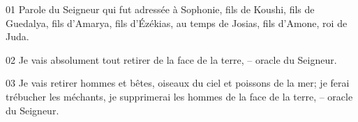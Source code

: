 01 Parole du Seigneur qui fut adressée à Sophonie, fils de Koushi, fils de Guedalya, fils d’Amarya, fils d’Ézékias, au temps de Josias, fils d’Amone, roi de Juda.

02 Je vais absolument tout retirer de la face de la terre, – oracle du Seigneur.

03 Je vais retirer hommes et bêtes, oiseaux du ciel et poissons de la mer; je ferai trébucher les méchants, je supprimerai les hommes de la face de la terre, – oracle du Seigneur.
